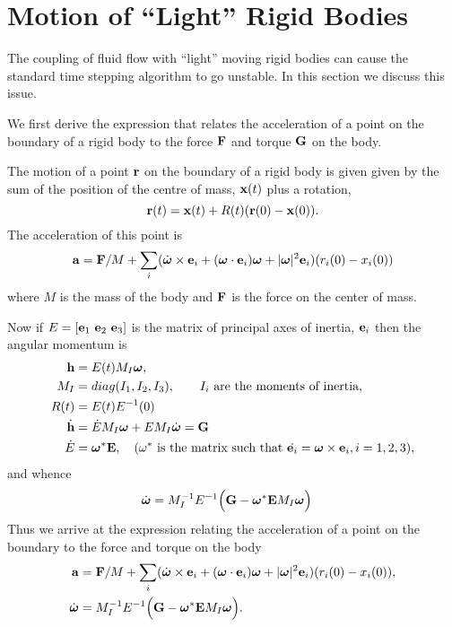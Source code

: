 \section{Motion of ``Light'' Rigid Bodies}\label{sec:lightBodies}

The coupling of fluid flow with ``light'' moving rigid bodies can cause 
the standard time stepping algorithm to go unstable. In this section
we discuss this issue.

We first derive the expression that relates the acceleration of a point on the boundary
of a rigid body to the force $\mathbf{ F}$ and torque $\mathbf{ G}$ on the body. 


The motion of a point $\mathbf{ r}$ on the boundary of a rigid body is given 
given by the sum of the position of the centre of mass, $\mathbf{ x}(t)$ plus a rotation,
\[
    \mathbf{ r}(t) = \mathbf{ x}(t) + R(t) (\mathbf{ r}(0)-\mathbf{ x}(0)) .
\]
The acceleration of this point is
\begin{align*}
   \mathbf{ a}= \mathbf{ F}/M +\sum_i (\dot{\boldsymbol{\omega}}\times\mathbf{ e}_i+(\boldsymbol{\omega}\cdot\mathbf{ e}_i)\boldsymbol{\omega}+|\boldsymbol{\omega}|^2\mathbf{ e}_i)(r_i(0)-x_i(0)) 
\end{align*}
where $M$ is the mass of the body and $\mathbf{ F}$ is the force on the center of mass.


Now if $E=[\mathbf{ e}_1~ \mathbf{ e}_2~ \mathbf{ e}_3]$ is the matrix of principal axes of inertia, $\mathbf{ e}_i$ then the angular momentum is
\begin{align*}
   \mathbf{ h} &= E(t) M_I \boldsymbol{\omega}, \\
    M_I &= diag( I_1, I_2, I_3 ), \qquad \text{$I_i$ are the moments of inertia}, \\
    R(t) &= E(t) E^{-1}(0)\\
   \dot{\mathbf{ h}} &= \dot{E} M_I \boldsymbol{\omega} + E M_I \dot{\boldsymbol{\omega}} = \mathbf{ G}  \\
    \dot{E} &= \boldsymbol{\omega}^*\mathbf{ E} , \quad (\text{$\omega^*$ is the matrix such that $\dot{\mathbf{ e}_i} = \boldsymbol{\omega}\times\mathbf{ e}_i, i=1,2,3$}), 
\end{align*}
and whence
\begin{align*}
   \dot{\boldsymbol{\omega}} &= M_I^{-1} E^{-1}\Big( \mathbf{ G} - \boldsymbol{\omega}^*\mathbf{ E} M_I \boldsymbol{\omega}\Big)
\end{align*}
Thus we arrive at the expression relating the acceleration of a point on the boundary to the force and 
torque on the body
\begin{align}
   \mathbf{ a} & = \mathbf{ F}/M +\sum_i (\dot{\boldsymbol{\omega}}\times\mathbf{ e}_i+(\boldsymbol{\omega}\cdot\mathbf{ e}_i)\boldsymbol{\omega}+|\boldsymbol{\omega}|^2\mathbf{ e}_i)(r_i(0)-x_i(0)) , \label{eq:solidAccel}\\
   \dot{\boldsymbol{\omega}} &= M_I^{-1} E^{-1}\Big( \mathbf{ G} - \boldsymbol{\omega}^*\mathbf{ E} M_I \boldsymbol{\omega}\Big).
\end{align}

